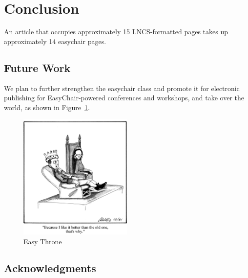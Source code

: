 \documentclass[]{easychair}
\newcommand{\easychair}{\textsf{easychair}}
\begin{document}
\section{Conclusion}
\label{sect:conclusion}

An article that occupies approximately 15 LNCS-formatted pages
takes up approximately 14 {\easychair} pages.

\subsection{Future Work}
\label{sect:future-work}

We plan to further strengthen the {\easychair} class and promote it for 
electronic publishing for EasyChair-powered conferences and workshops,
and take over the world, as shown in Figure~\ref{fig:easythrone}.

\begin{figure}[htb!]
	\begin{centering}
	\includegraphics[width=0.5\textwidth]{throneEC.jpg}
	\caption{Easy Throne}
	\label{fig:easythrone}
	\end{centering}
\end{figure}

\subsection{Acknowledgments}
\label{sect:acks}
\end{document}
